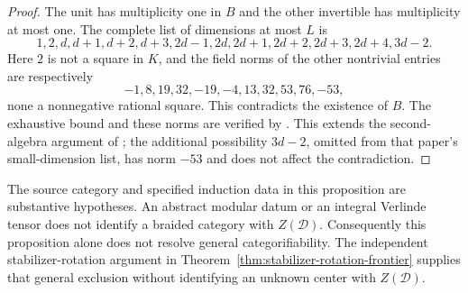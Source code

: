 \begin{proof}
The unit has multiplicity one in $B$ and the other invertible has
multiplicity at most one. The complete list of dimensions at most $L$ is
\[
 1,2,d,d+1,d+2,d+3,
 2d-1,2d,2d+1,2d+2,2d+3,2d+4,3d-2.
\]
Here $2$ is not a square in $K$, and the field norms of the other
nontrivial entries are respectively
\[
 -1,8,19,32,-19,-4,13,32,53,76,-53,
\]
none a nonnegative rational square. This contradicts the existence of
$B$. The exhaustive bound and these norms are verified by
.
This extends the second-algebra argument of
\cite[Lemmas~4.15--4.16]{GISAH}; the additional possibility $3d-2$,
omitted from that paper's small-dimension list, has norm $-53$ and
does not affect the contradiction.
\end{proof}

The source category and specified induction data in this proposition
are substantive hypotheses. An abstract modular datum or an integral
Verlinde tensor does not identify a braided category with $Z(\mathcal D)$.
Consequently this proposition alone does not resolve general
categorifiability. The independent stabilizer-rotation argument in
Theorem~\ref{thm:stabilizer-rotation-frontier} supplies that general
exclusion without identifying an unknown center with $Z(\mathcal D)$.
